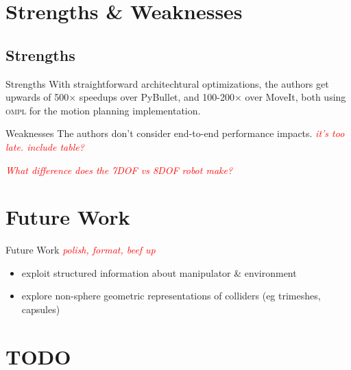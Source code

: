 \documentclass{beamer}
\newcommand{\todo}[1]{\textit{\textcolor{red}{#1}}}
\begin{document}
\section{Strengths \& Weaknesses}

\subsection{Strengths}

\begin{frame}{Strengths}
With straightforward architechtural optimizations, the authors get upwards of 500$\times$ speedups over PyBullet, and 100-200$\times$ over MoveIt, both using \textsc{ompl} for the motion planning implementation.

\end{frame}

\begin{frame}{Weaknesses}
The authors don't consider end-to-end performance impacts. \todo{it's too late. include table?}

\todo{What difference does the 7DOF vs 8DOF robot make?}
\end{frame}

\section{Future Work}

\begin{frame}{Future Work}
\todo{polish, format, beef up}

\begin{itemize}
\item exploit structured information about manipulator \& environment
\item explore non-sphere geometric representations of colliders (eg trimeshes, capsules)
\end{itemize}
\end{frame}

\section {TODO}

\end{document}
